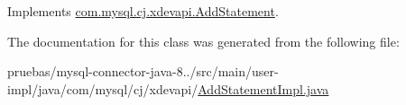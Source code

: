 Implements \mbox{\hyperlink{interfacecom_1_1mysql_1_1cj_1_1xdevapi_1_1_add_statement_ab2681842a71332f6170cb5b227ff6ebd}{com.\+mysql.\+cj.\+xdevapi.\+Add\+Statement}}.



The documentation for this class was generated from the following file\+:\begin{DoxyCompactItemize}
\item 
pruebas/mysql-\/connector-\/java-\/8../src/main/user-\/impl/java/com/mysql/cj/xdevapi/\mbox{\hyperlink{_add_statement_impl_8java}{Add\+Statement\+Impl.\+java}}\end{DoxyCompactItemize}
